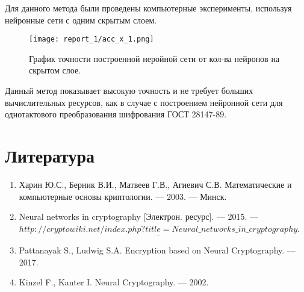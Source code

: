 \documentclass[a4paper,12pt,twoside]{article}
\begin{document}
	\noindent Для данного метода были проведены компьютерные эксперименты, используя нейронные сети с одним скрытым слоем.

	\begin{figure}[h!]
	\texttt{[image: report\_1/acc\_x\_1.png]}
	
	График точности построенной неройной сети от кол-ва нейронов на скрытом слое.
	\end{figure}
	
	\bigskip
	
	\noindent Данный метод показывает высокую точность и не требует больших вычислительных ресурсов, как в случае с построением нейронной сети для однотактового преобразования шифрования ГОСТ 28147-89.
	
	\newpage	
	\section*{Литература}
	\bigskip
	\begin{enumerate}
		\item Харин Ю.С., Берник В.И., Матвеев Г.В., Агиевич С.В. Математические и компьютерные основы криптологии. — 2003. — Минск.
		\item Neural networks in cryptography [Электрон. ресурс]. — 2015. — \\
		$\underline{http://cryptowiki.net/index.php?title=Neural\_networks\_in\_cryptography}$.
		\item Pattanayak S., Ludwig S.A. Encryption based on Neural Cryptography. — 2017.
		\item Kinzel F., Kanter I. Neural Cryptography. — 2002.
	\end{enumerate}
	
\end{document}
